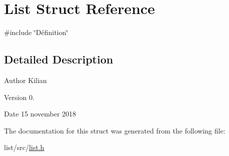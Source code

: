 \hypertarget{structList}{}\section{List Struct Reference}
\label{structList}


{\ttfamily \#include \char`\"{}Définition\char`\"{}}



\subsection{Detailed Description}
\begin{DoxyAuthor}{Author}
Kilian 
\end{DoxyAuthor}
\begin{DoxyVersion}{Version}
0. 
\end{DoxyVersion}
\begin{DoxyDate}{Date}
15 november 2018 
\end{DoxyDate}


The documentation for this struct was generated from the following file\+:\begin{DoxyCompactItemize}
\item 
list/src/\mbox{\hyperlink{list_8h}{list.\+h}}\end{DoxyCompactItemize}
